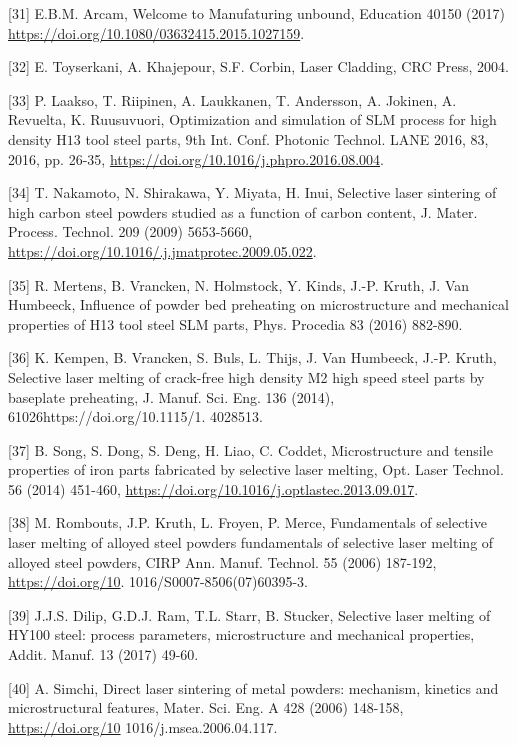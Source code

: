 \documentclass[10pt]{article}
\begin{document}
[31] E.B.M. Arcam, Welcome to Manufaturing unbound, Education 40150 (2017) \href{https://doi.org/10.1080/03632415.2015.1027159}{https://doi.org/10.1080/03632415.2015.1027159}.

[32] E. Toyserkani, A. Khajepour, S.F. Corbin, Laser Cladding, CRC Press, 2004.

[33] P. Laakso, T. Riipinen, A. Laukkanen, T. Andersson, A. Jokinen, A. Revuelta, K. Ruusuvuori, Optimization and simulation of SLM process for high density $\mathrm{H} 13$ tool steel parts, 9th Int. Conf. Photonic Technol. LANE 2016, 83, 2016, pp. 26-35, \href{https://doi.org/10.1016/j.phpro.2016.08.004}{https://doi.org/10.1016/j.phpro.2016.08.004}.

[34] T. Nakamoto, N. Shirakawa, Y. Miyata, H. Inui, Selective laser sintering of high carbon steel powders studied as a function of carbon content, J. Mater. Process. Technol. 209 (2009) 5653-5660, \href{https://doi.org/10.1016/.j.jmatprotec.2009.05.022}{https://doi.org/10.1016/.j.jmatprotec.2009.05.022}.

[35] R. Mertens, B. Vrancken, N. Holmstock, Y. Kinds, J.-P. Kruth, J. Van Humbeeck, Influence of powder bed preheating on microstructure and mechanical properties of H13 tool steel SLM parts, Phys. Procedia 83 (2016) 882-890.

[36] K. Kempen, B. Vrancken, S. Buls, L. Thijs, J. Van Humbeeck, J.-P. Kruth, Selective laser melting of crack-free high density M2 high speed steel parts by baseplate preheating, J. Manuf. Sci. Eng. 136 (2014), 61026https://doi.org/10.1115/1. 4028513.

[37] B. Song, S. Dong, S. Deng, H. Liao, C. Coddet, Microstructure and tensile properties of iron parts fabricated by selective laser melting, Opt. Laser Technol. 56 (2014) 451-460, \href{https://doi.org/10.1016/j.optlastec.2013.09.017}{https://doi.org/10.1016/j.optlastec.2013.09.017}.

[38] M. Rombouts, J.P. Kruth, L. Froyen, P. Merce, Fundamentals of selective laser melting of alloyed steel powders fundamentals of selective laser melting of alloyed steel powders, CIRP Ann. Manuf. Technol. 55 (2006) 187-192, \href{https://doi.org/10}{https://doi.org/10}. 1016/S0007-8506(07)60395-3.

[39] J.J.S. Dilip, G.D.J. Ram, T.L. Starr, B. Stucker, Selective laser melting of HY100 steel: process parameters, microstructure and mechanical properties, Addit. Manuf. 13 (2017) 49-60.

[40] A. Simchi, Direct laser sintering of metal powders: mechanism, kinetics and microstructural features, Mater. Sci. Eng. A 428 (2006) 148-158, \href{https://doi.org/10}{https://doi.org/10} 1016/j.msea.2006.04.117.
\end{document}
